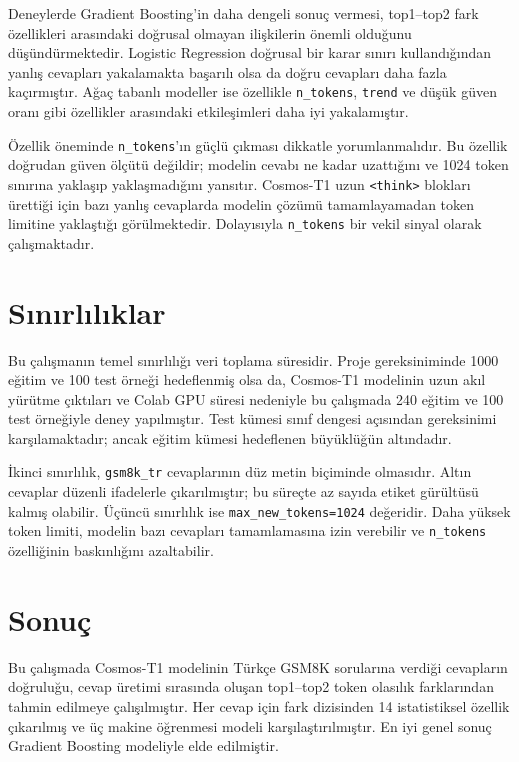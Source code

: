 \documentclass[conference]{IEEEtran}
\begin{document}
Deneylerde Gradient Boosting'in daha dengeli sonuç vermesi, top1--top2 fark
özellikleri arasındaki doğrusal olmayan ilişkilerin önemli olduğunu
düşündürmektedir. Logistic Regression doğrusal bir karar sınırı kullandığından
yanlış cevapları yakalamakta başarılı olsa da doğru cevapları daha fazla
kaçırmıştır. Ağaç tabanlı modeller ise özellikle \texttt{n\_tokens},
\texttt{trend} ve düşük güven oranı gibi özellikler arasındaki etkileşimleri
daha iyi yakalamıştır.

Özellik öneminde \texttt{n\_tokens}'ın güçlü çıkması dikkatle yorumlanmalıdır.
Bu özellik doğrudan güven ölçütü değildir; modelin cevabı ne kadar uzattığını
ve 1024 token sınırına yaklaşıp yaklaşmadığını yansıtır. Cosmos-T1 uzun
\texttt{<think>} blokları ürettiği için bazı yanlış cevaplarda modelin çözümü
tamamlayamadan token limitine yaklaştığı görülmektedir. Dolayısıyla
\texttt{n\_tokens} bir vekil sinyal olarak çalışmaktadır.

\section{Sınırlılıklar}

Bu çalışmanın temel sınırlılığı veri toplama süresidir. Proje gereksiniminde
1000 eğitim ve 100 test örneği hedeflenmiş olsa da, Cosmos-T1 modelinin uzun
akıl yürütme çıktıları ve Colab GPU süresi nedeniyle bu çalışmada 240 eğitim ve
100 test örneğiyle deney yapılmıştır. Test kümesi sınıf dengesi açısından
gereksinimi karşılamaktadır; ancak eğitim kümesi hedeflenen büyüklüğün
altındadır.

İkinci sınırlılık, \texttt{gsm8k\_tr} cevaplarının düz metin biçiminde olmasıdır.
Altın cevaplar düzenli ifadelerle çıkarılmıştır; bu süreçte az sayıda etiket
gürültüsü kalmış olabilir. Üçüncü sınırlılık ise \texttt{max\_new\_tokens=1024}
değeridir. Daha yüksek token limiti, modelin bazı cevapları tamamlamasına izin
verebilir ve \texttt{n\_tokens} özelliğinin baskınlığını azaltabilir.

\section{Sonuç}

Bu çalışmada Cosmos-T1 modelinin Türkçe GSM8K sorularına verdiği cevapların
doğruluğu, cevap üretimi sırasında oluşan top1--top2 token olasılık farklarından
tahmin edilmeye çalışılmıştır. Her cevap için fark dizisinden 14 istatistiksel
özellik çıkarılmış ve üç makine öğrenmesi modeli karşılaştırılmıştır. En iyi
genel sonuç Gradient Boosting modeliyle elde edilmiştir.
\end{document}
